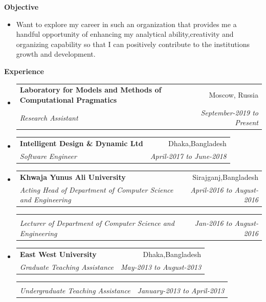 \documentclass[letterpaper,10pt]{article}
\makeatletter
\newcommand{\resitem}[1]{\item #1 \vspace{-2pt}}
\newcommand{\resheading}[1]{{\large \colorbox{mygrey}{\begin{minipage}{\textwidth}{\textbf{#1 \vphantom{p\^{E}}}}\end{minipage}}}}
\newcommand{\ressubheading}[4]{
\begin{tabular*}{6.5in}{l@{\extracolsep{\fill}}r}
		\textbf{#1} & #2 \\
		\textit{#3} & \textit{#4} \\
\end{tabular*}\vspace{-6pt}}
\makeatother
\begin{document}
\vspace{0.1in}

\resheading{Objective}
\begin{itemize}
\resitem{ \justify
 Want to explore my career in such an organization that provides me a handful opportunity of enhancing my analytical ability,creativity and organizing capability so that I can positively contribute to the institutions growth and development.


 }
\end{itemize}

\vspace{0.1in}
\resheading{Experience}
\begin{itemize}


\item

\ressubheading{Laboratory for Models and Methods of Computational Pragmatics}{Moscow, Russia}{Research Assistant}{September-2019 to Present}

\item

\ressubheading{Intelligent Design \& Dynamic Ltd}{Dhaka,Bangladesh}{Software Engineer}{April-2017 to June-2018}
\item
\ressubheading{Khwaja Yunus Ali University}{Sirajganj,Bangladesh}{Acting Head of Department of Computer Science and Engineering}{April-2016 to August-2016}
\ressubheading{ }{}{Lecturer of Department of Computer Science and Engineering}{Jan-2016 to August-2016 }
\item
	\ressubheading{East West University}{Dhaka,Bangladesh}{Graduate Teaching Assistance }{May-2013 to August-2013 }
\ressubheading{}{}{Undergraduate Teaching Assistance}{January-2013 to April-2013}	
\end{itemize}
\end{document}
